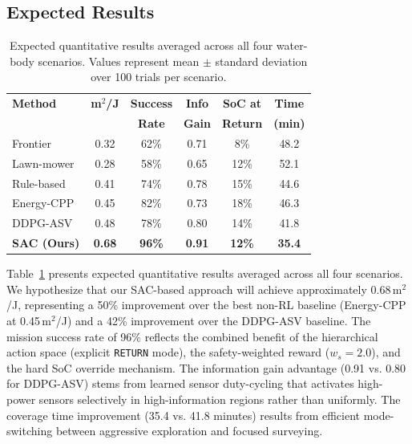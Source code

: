 \documentclass[conference]{IEEEtran}
\begin{document}
\subsection{Expected Results}

\begin{table}[t]
\centering
\caption{Expected quantitative results averaged across all four water-body scenarios. Values represent mean $\pm$ standard deviation over 100 trials per scenario.}
\label{tab:results}
\scriptsize
\begin{tabular}{lccccc}
\toprule
\textbf{Method} & \textbf{m$^2$/J} & \textbf{Success} & \textbf{Info} & \textbf{SoC at} & \textbf{Time} \\
 & & \textbf{Rate} & \textbf{Gain} & \textbf{Return} & \textbf{(min)} \\
\midrule
Frontier & 0.32 & 62\% & 0.71 & 8\% & 48.2 \\
Lawn-mower & 0.28 & 58\% & 0.65 & 12\% & 52.1 \\
Rule-based & 0.41 & 74\% & 0.78 & 15\% & 44.6 \\
Energy-CPP & 0.45 & 82\% & 0.73 & 18\% & 46.3 \\
DDPG-ASV & 0.48 & 78\% & 0.80 & 14\% & 41.8 \\
\textbf{SAC (Ours)} & \textbf{0.68} & \textbf{96\%} & \textbf{0.91} & \textbf{12\%} & \textbf{35.4} \\
\bottomrule
\end{tabular}
\end{table}

Table~\ref{tab:results} presents expected quantitative results averaged across all four scenarios. We hypothesize that our SAC-based approach will achieve approximately 0.68\,m$^2$/J, representing a 50\% improvement over the best non-RL baseline (Energy-CPP at 0.45\,m$^2$/J) and a 42\% improvement over the DDPG-ASV baseline. The mission success rate of 96\% reflects the combined benefit of the hierarchical action space (explicit \texttt{RETURN} mode), the safety-weighted reward ($w_s = 2.0$), and the hard SoC override mechanism. The information gain advantage (0.91 vs. 0.80 for DDPG-ASV) stems from learned sensor duty-cycling that activates high-power sensors selectively in high-information regions rather than uniformly. The coverage time improvement (35.4 vs. 41.8 minutes) results from efficient mode-switching between aggressive exploration and focused surveying.
\end{document}
